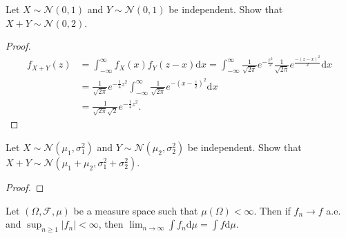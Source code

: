 \documentclass[11pt,singlecolumn, openany, citestyle=authoryear]{elegantbook}
\begin{document}
\begin{CJK}{UTF8}{gbsn}
\begin{example}
    Let $X\sim \mathcal{N}(0,1)$ and $Y \sim \mathcal{N}(0,1)$ be independent. Show that 
    $X+Y \sim \mathcal{N}(0,2)$.
\end{example}
\begin{proof}
    \begin{align*}
        f_{X+Y}(z)&=\int_{-\infty}^\infty f_X(x)f_Y(z-x)\mathrm{d}x = 
        \int_{-\infty}^\infty \frac{1}{\sqrt{2\pi}}e^{-\frac{x^2}{2}} \frac{1}{\sqrt{2\pi}} 
        e^{\frac{-(z-x)^2}{2}} \mathrm{d}x \\
        &= \frac{1}{\sqrt{2\pi}} e^{-\frac{1}{4}z^2}
        \int_{-\infty}^\infty \frac{1}{\sqrt{2\pi}} e^{-(x-\frac{z}{2})^2}\mathrm{d}x \\
        &=\frac{1}{\sqrt{2\pi}\sqrt{2}}e^{-\frac{1}{4}z^2}.
    \end{align*}
\end{proof}
\begin{exercise}
    Let $X\sim \mathcal{N}(\mu_1,\sigma_1^2)$ and 
    $Y \sim \mathcal{N}(\mu_2,\sigma_2^2)$ be independent. Show that 
    $X+Y \sim \mathcal{N}(\mu_1+\mu_2,\sigma_1^2+\sigma_2^2)$.
\end{exercise}
\begin{proof}
    
\end{proof}

\begin{theorem}
    Let $(\Omega,\mathcal{F},\mu)$ be a measure space such that 
    $\mu(\Omega)<\infty$. Then if $f_n\to f$ a.e. and 
    $\sup_{n\geqslant 1}|f_n|<\infty$, then 
    $\displaystyle\lim_{n\to\infty}\int f_n\mathrm{d}\mu=\int f\mathrm{d}\mu$.
\end{theorem}


\end{CJK}
\end{document}
